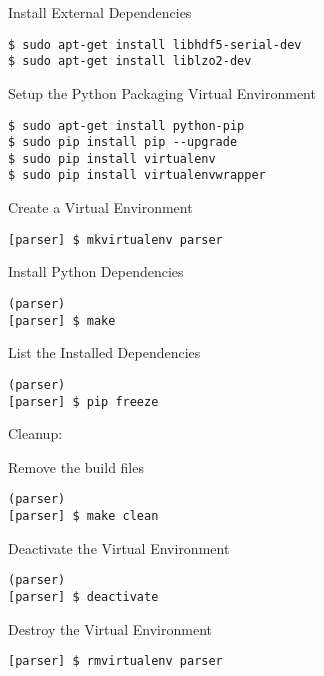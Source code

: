 Install External Dependencies

\begin{lstlisting}
$ sudo apt-get install libhdf5-serial-dev
$ sudo apt-get install liblzo2-dev
\end{lstlisting}

Setup the Python Packaging Virtual Environment

\begin{lstlisting}
$ sudo apt-get install python-pip
$ sudo pip install pip --upgrade
$ sudo pip install virtualenv
$ sudo pip install virtualenvwrapper
\end{lstlisting}

Create a Virtual Environment

\begin{lstlisting}
[parser] $ mkvirtualenv parser
\end{lstlisting}

Install Python Dependencies

\begin{lstlisting}
(parser)
[parser] $ make
\end{lstlisting}

List the Installed Dependencies

\begin{lstlisting}
(parser)
[parser] $ pip freeze
\end{lstlisting}

Cleanup:

Remove the build files

\begin{lstlisting}
(parser)
[parser] $ make clean
\end{lstlisting}

Deactivate the Virtual Environment

\begin{lstlisting}
(parser)
[parser] $ deactivate
\end{lstlisting}

Destroy the Virtual Environment

\begin{lstlisting}
[parser] $ rmvirtualenv parser  
\end{lstlisting}

